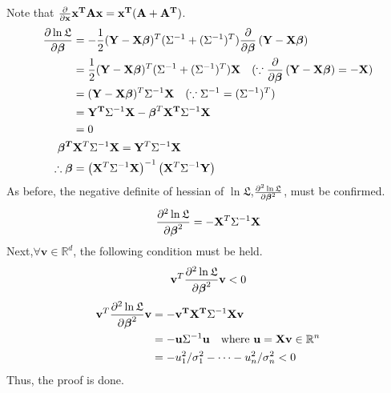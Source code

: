 \documentclass[10pt]{article}
\begin{document}
Note that ${\partial \over \partial \mathbf{x}} \mathbf{x^TAx} = \mathbf{x^T(A + A^T)}$.
\begin{align*}
    {\partial \ln \mathfrak{L} \over \partial \boldsymbol{\beta}} &= -\frac{1}{2}(\mathbf{Y - X}\boldsymbol{\beta})^T(\Sigma^{-1} + (\Sigma^{-1})^T) {\partial \over \partial \boldsymbol{\beta}}\left(\mathbf{Y - X}\boldsymbol{\beta}\right) \\
    &=  \frac{1}{2}(\mathbf{Y - X}\boldsymbol{\beta})^T(\Sigma^{-1} + (\Sigma^{-1})^T)\mathbf{X} \quad (\because {\partial \over \partial \boldsymbol{\beta}}\left(\mathbf{Y - X}\boldsymbol{\beta}\right) = -\mathbf{X}) \\
    &= (\mathbf{Y - X}\boldsymbol{\beta})^T\Sigma^{-1}\mathbf{X} \quad (\because \Sigma^{-1} = (\Sigma^{-1})^T) \\
    &= \mathbf{Y^T}\Sigma^{-1} \mathbf{X} - \boldsymbol{\beta}^T\mathbf{X^T}\Sigma^{-1}\mathbf{X} \\
    &= 0\\
    \boldsymbol{\beta^T}&\mathbf{X}^T\Sigma^{-1}\mathbf{X} = \mathbf{Y}^T\Sigma^{-1} \mathbf{X}\\
    \therefore \boldsymbol{\beta} &= \left(\mathbf{X}^T \Sigma^{-1}\mathbf{X}\right)^{-1}\left(\mathbf{X}^T\Sigma^{-1}\mathbf{Y}\right)
\end{align*}
As before, the negative definite of hessian of $\ln \mathfrak{L}$,${\partial^2 \ln \mathfrak{L} \over \partial \boldsymbol{\beta}^2}$, must be confirmed.
\begin{equation}
    {\partial^2 \ln \mathfrak{L} \over \partial \boldsymbol{\beta}^2} = - \mathbf{X}^T\Sigma^{-1}\mathbf{X}
\end{equation}
Next,$\forall \mathbf{v}\in \mathbb{R}^d$, the following condition must be held.  
\begin{equation*}
    \mathbf{v}^T{\partial^2 \ln \mathfrak{L} \over \partial \boldsymbol{\beta}^2}\mathbf{v} < 0
\end{equation*}
\begin{align*}
    \mathbf{v}^T{\partial^2 \ln \mathfrak{L} \over \partial \boldsymbol{\beta}^2}\mathbf{v} &= - \mathbf{v^TX^T}\Sigma^{-1}\mathbf{Xv} \\
    &= -\mathbf{u}\Sigma^{-1}\mathbf{u}\quad \text{where } \mathbf{u = Xv}\in \mathbb{R}^n \\
    &= -u_1^2/\sigma_1^2 - \cdots - u_n^2/\sigma_n^2 <0
\end{align*}
Thus, the proof is done.
\end{document}
